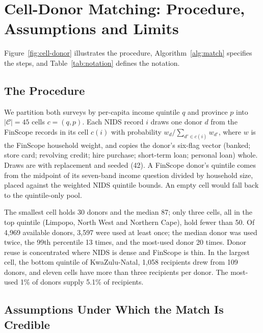 \section{Cell-Donor Matching: Procedure, Assumptions and Limits}
\label{app:matching}

Figure~\ref{fig:cell-donor} illustrates the procedure, Algorithm~\ref{alg:match} specifies the
steps, and Table~\ref{tab:notation} defines the notation.

\subsection{The Procedure}\label{app:match-procedure}

We partition both surveys by per-capita income quintile $q$ and province $p$ into
$|\mathcal{C}| = 45$ cells $c = (q, p)$. Each \ac{NIDS} record $i$ draws one donor $d$ from the
\ac{FinScope} records in its cell $c(i)$ with probability $w_d / \sum_{d' \in c(i)} w_{d'}$, where
$w$ is the \ac{FinScope} household weight, and copies the donor's six-flag vector (banked; store
card; revolving credit; hire purchase; short-term loan; personal loan) whole. Draws are with
replacement and seeded (42). A \ac{FinScope} donor's quintile comes from the midpoint of its
seven-band income question divided by household size, placed against the weighted \ac{NIDS}
quintile bounds. An empty cell would fall back to the quintile-only pool.

The smallest cell holds 30 donors and the median 87; only three cells, all in the top quintile
(Limpopo, North West and Northern Cape), hold fewer than 50. Of 4{,}969 available donors,
3{,}597 were used at least once; the median donor was used twice, the 99th percentile 13 times,
and the most-used donor 20 times. Donor reuse is concentrated where \ac{NIDS} is dense and
\ac{FinScope} is thin. In the largest cell, the bottom quintile of KwaZulu-Natal, 1{,}058
recipients drew from 109 donors, and eleven cells have more than three recipients per donor.
The most-used 1\% of donors supply 5.1\% of recipients.

\subsection{Assumptions Under Which the Match Is Credible}\label{app:match-assumptions}

